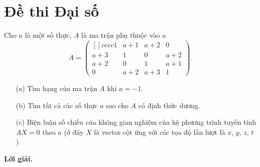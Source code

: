 \newpage
\section{Đề thi Đại số}
\begin{tcolorbox}[title=\textbf{Bài toán B.1.}]
    Cho $a$ là một số thực, $A$ là ma trận phụ thuộc vào $a$
    $$A = \begin{pmatrix}[]{cccc}
        1 & a+1 & a+2 & 0 \\
        a+3 & 1 & 0 & a+2 \\
        a+2 & 0 & 1 & a+1 \\
        0 & a+2 & a+3 & 1 
    \end{pmatrix}.$$

    \begin{enumerate}
        \item[(a)] Tìm hạng của ma trận $A$ khi $a = -1$.
        \item[(b)] Tìm tất cả các số thực $a$ sao cho $A$ có định thức dương.
        \item[(c)] Biện luận số chiều của không gian nghiệm của hệ phương trình tuyến tính $AX = 0$ theo $a$ (ở đây $X$ là vector cột ứng với các tọa độ lần lượt là $x,\,y,\,z,\,t$). 
    \end{enumerate}
\end{tcolorbox}

\textbf{Lời giải.}

